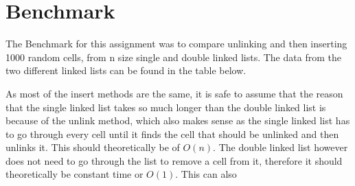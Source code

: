 \documentclass[a4paper,11pt]{article}
\begin{document}
\section*{Benchmark}
The Benchmark for this assignment was to compare unlinking and then inserting 1000 random cells, from n size single and double linked lists. 
The data from the two different linked lists can be found in the table below.
\begin{table}[h]
    \begin{center}
    \caption{The result of using unlink and insert on the two lists}
    \label{tab:table1}
    \end{center}
\end{table}
{\noindent}
\newline
As most of the insert methods are the same, it is safe to assume that the reason that the single linked list takes so much longer than the double linked list 
is because of the unlink method, which also makes sense as the single linked list has to go through every cell until it finds the cell that should be unlinked and then unlinks it. This should 
theoretically be of $O(n)$. The double linked list however does not need to go through the list to remove a cell from it, therefore it should theoretically be constant time or $O(1)$. This can also
\end{document}
